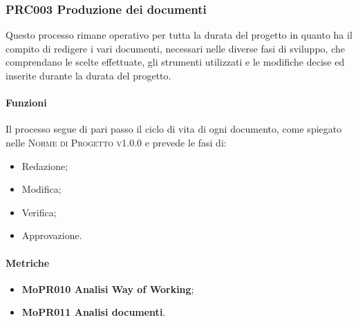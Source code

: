 \documentclass[../piano-di-qualifica.tex]{subfiles}
\begin{document}
\subsubsection{PRC003 Produzione dei documenti}
\label{sub:produzione_dei_documenti}
Questo processo rimane operativo per tutta la durata del progetto in quanto ha il compito di redigere i vari documenti, necessari nelle diverse fasi di sviluppo, che comprendano le scelte effettuate, gli strumenti utilizzati e le modifiche decise ed inserite durante la durata del progetto.

\paragraph{Funzioni}
\label{sub:funzioni_3}
Il processo segue di pari passo il ciclo di vita di ogni documento, come spiegato nelle \textsc{Norme di Progetto v1.0.0} e prevede le fasi di:
\begin{itemize}
    \item Redazione;
    \item Modifica;
    \item Verifica;
    \item Approvazione.        
\end{itemize}

\paragraph{Metriche}
\label{sub:metriche_3}
\begin{itemize}
    \item \textbf{MoPR010 Analisi Way of Working};
    \item \textbf{MoPR011 Analisi documenti}.
\end{itemize}
\end{document}
